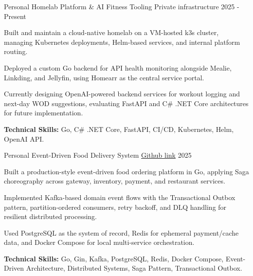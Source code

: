 

\begin{cventries}

  \cventry
    {Personal} %
    {Homelab Platform \& AI Fitness Tooling} %
    {Private infrastructure} %
    {2025 - Present} %
    {
      \begin{cvitems} %
        \item {Built and maintain a cloud-native homelab on a VM-hosted k3s cluster, managing Kubernetes deployments, Helm-based services, and internal platform routing.}
        \item {Deployed a custom Go backend for API health monitoring alongside Mealie, Linkding, and Jellyfin, using Homearr as the central service portal.}
        \item {Currently designing OpenAI-powered backend services for workout logging and next-day WOD suggestions, evaluating FastAPI and C\# .NET Core architectures for future implementation.}
        \item {\textbf{Technical Skills:} Go, C\# .NET Core, FastAPI, CI/CD, Kubernetes, Helm, OpenAI API.}
      \end{cvitems}
    }

  \cventry
    {Personal} %
    {Event-Driven Food Delivery System} %
    {\href{https://github.com/SotirisKavv/food-delivery-saga}{Github link}} %
    {2025} %
    {
      \begin{cvitems} %
        \item {Built a production-style event-driven food ordering platform in Go, applying Saga choreography across gateway, inventory, payment, and restaurant services.}
        \item {Implemented Kafka-based domain event flows with the Transactional Outbox pattern, partition-ordered consumers, retry backoff, and DLQ handling for resilient distributed processing.}
        \item {Used PostgreSQL as the system of record, Redis for ephemeral payment/cache data, and Docker Compose for local multi-service orchestration.}
        \item {\textbf{Technical Skills:} Go, Gin, Kafka, PostgreSQL, Redis, Docker Compose, Event-Driven Architecture, Distributed Systems, Saga Pattern, Transactional Outbox.}
      \end{cvitems}
    }


\end{cventries}
